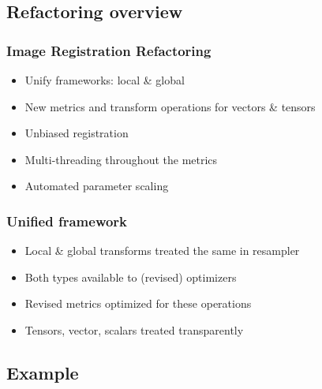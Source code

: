 \subsection{Refactoring overview}

\begin{frame}
\frametitle{Image Registration Refactoring}
\Large
\begin{itemize}
\item Unify frameworks: local \& global 
\pause
\item New metrics and transform operations for vectors \&  tensors
\pause
\item Unbiased registration
\pause
\item Multi-threading throughout the metrics
\pause 
\item Automated parameter scaling
\end{itemize}
\end{frame}

\begin{frame}
\frametitle{Unified framework}
\Large
\begin{itemize}
\item Local \& global transforms treated the same in resampler
\item Both types available to (revised) optimizers
\item Revised metrics optimized for these operations
\item Tensors, vector, scalars treated transparently
\end{itemize}
\end{frame}
\subsection{Example}

